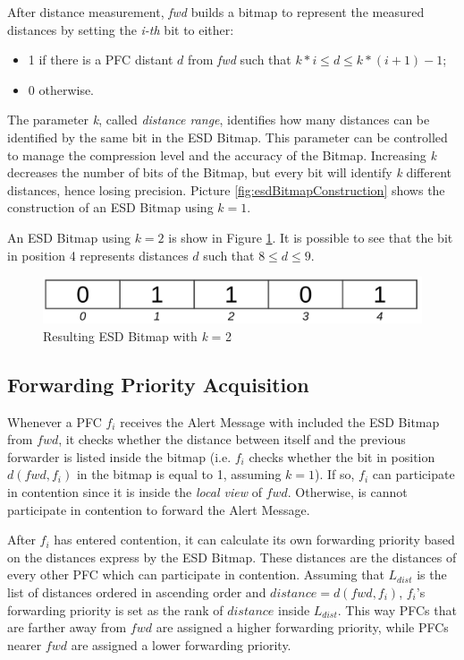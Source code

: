 			After distance measurement, \textit{fwd} builds a bitmap to represent the measured distances by setting the \textit{i-th} bit to either:
			\begin{itemize}
				\item 1 if there is a PFC distant $d$ from \textit{fwd} such that $k * i \leq d \leq k * ( i + 1 ) - 1$;
				\item 0 otherwise.
			\end{itemize} 
			The parameter \textit{k}, called \textit{distance range}, identifies how many distances can be identified by the same bit in the ESD Bitmap. This parameter can be controlled to manage the compression level and the accuracy of the Bitmap. Increasing \textit{k} decreases the number of bits of the Bitmap, but every bit will identify \textit{k} different distances, hence losing precision.
			Picture \ref{fig:esdBitmapConstruction} shows the construction of an ESD Bitmap using $k = 1$.
			
			
			An ESD Bitmap using $k = 2$ is show in Figure \ref{fig:esdBitmapConstructionK2}. It is possible to see that the bit in position 4 represents distances $d$ such that $8 \leq d \leq 9$. 
			
			\begin{figure}[H]
				\centering
				\includegraphics[width=\textwidth]{immagini/esdBitmapConstructionK2}
				\caption{Resulting ESD Bitmap with \textit{k} = 2}
				\label{fig:esdBitmapConstructionK2}
			\end{figure}
		
		\subsection{Forwarding Priority Acquisition}
			Whenever a PFC $f_i$ receives the Alert Message with included the ESD Bitmap from $fwd$, it checks whether the distance between itself and the previous forwarder is listed inside the bitmap (i.e. $f_i$ checks whether the bit in position $d(fwd, f_i)$ in the bitmap is equal to 1, assuming $k = 1$). If so, $f_i$ can participate in contention since it is inside the \textit{local view} of $fwd$. Otherwise, is cannot participate in contention to forward the Alert Message.
			
			
			After $f_i$ has entered contention, it can calculate its own forwarding priority based on the distances express by the ESD Bitmap. These distances are the distances of every other PFC which can participate in contention. Assuming that $L_{dist}$ is the list of distances ordered in ascending order and $distance = d(fwd, f_i)$, $f_i$'s forwarding priority is set as the rank of $distance$ inside $L_{dist}$. This way PFCs that are farther away from $fwd$ are assigned a higher forwarding priority, while PFCs nearer $fwd$ are assigned a lower forwarding priority.
			
